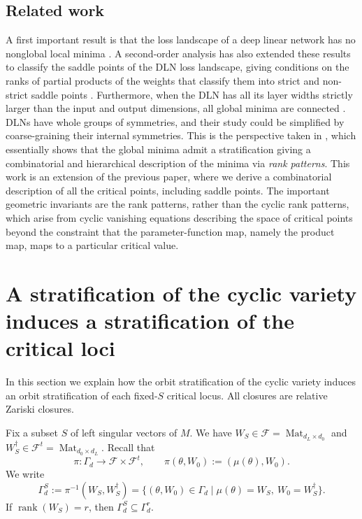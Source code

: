 \documentclass[11pt]{article}
\theoremstyle{definition}
\begin{document}
\subsection{Related work}
A first important result is that the loss landscape of a deep linear network has no nonglobal local minima \cite{baldi1989neural,kawaguchi2016deep}. A second-order analysis has also extended these results to classify the saddle points of the DLN loss landscape, giving conditions on the ranks of partial products of the weights that classify them into strict and non-strict saddle points \cite{achour2024loss}. Furthermore, when the DLN has all its layer widths strictly larger than the input and output dimensions, all global minima are connected \cite{trager2019pure}. DLNs have whole groups of symmetries, and their study could be simplified by coarse-graining their internal symmetries. This is the perspective taken in \cite{lehalleur2024geometry}, which essentially shows that the global minima admit a stratification giving a combinatorial and hierarchical description of the minima via \textit{rank patterns}. This work is an extension of the previous paper, where we derive a combinatorial description of all the critical points, including saddle points. The important geometric invariants are the rank patterns, rather than the cyclic rank patterns, which arise from cyclic vanishing equations describing the space of critical points beyond the constraint that the parameter-function map, namely the product map, maps to a particular critical value.
\section{A stratification of the cyclic variety induces a stratification of the critical loci}
\label{sec:cyclic-stratification-critical-loci}

In this section we explain how the orbit stratification of the cyclic variety
induces an orbit stratification of each fixed-\(S\) critical locus. All
closures are relative Zariski closures.

Fix a subset \(S\) of left singular vectors of \(M\). We have \(W_S\in\mathcal F=\operatorname{Mat}_{d_L\times d_0}\) and
\(W_S^{\dagger}\in\mathcal F^t=\operatorname{Mat}_{d_0\times d_L}\). Recall that
\[
\pi:\Gamma_d\longrightarrow \mathcal F\times \mathcal F^t,
\qquad
\pi(\theta,W_0):=(\mu(\theta),W_0).
\]
We write
\[
\Gamma_d^S:=\pi^{-1}(W_S,W_S^{\dagger})
=
\{(\theta,W_0)\in\Gamma_d\mid \mu(\theta)=W_S,\ W_0=W_S^{\dagger}\}.
\]
If \(\operatorname{rank}(W_S)=r\), then \(\Gamma_d^S\subseteq \Gamma_d^r\).
\end{document}
